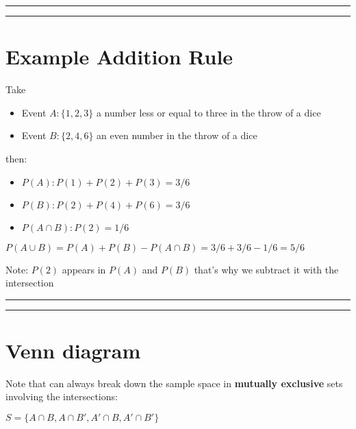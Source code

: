\documentclass[
]{book}
\providecommand{\tightlist}{%
  \setlength{\itemsep}{0pt}\setlength{\parskip}{0pt}}
\begin{document}
\begin{center}\rule{0.5\linewidth}{0.5pt}\end{center}

\begin{center}\rule{0.5\linewidth}{0.5pt}\end{center}

\hypertarget{example-addition-rule}{%
\section{Example Addition Rule}\label{example-addition-rule}}

Take

\begin{itemize}
\tightlist
\item
  Event \(A:\{1,2,3\}\) a number less or equal to three in the throw of a dice\\
\item
  Event \(B:\{2,4,6\}\) an even number in the throw of a dice
\end{itemize}

then:

\begin{itemize}
\tightlist
\item
  \(P(A): P(1) + P(2) + P(3)=3/6\)
\item
  \(P(B): P(2) + P(4) + P(6)=3/6\)
\item
  \(P(A \cap B): P(2) = 1/6\)
\end{itemize}

\(P(A \cup B)=P(A) + P(B) - P(A\cap B)=3/6+3/6-1/6=5/6\)

Note: \(P(2)\) appears in \(P(A)\) and \(P(B)\) that's why we subtract it with the intersection

\begin{center}\rule{0.5\linewidth}{0.5pt}\end{center}

\begin{center}\rule{0.5\linewidth}{0.5pt}\end{center}

\hypertarget{venn-diagram}{%
\section{Venn diagram}\label{venn-diagram}}

Note that can always break down the sample space in \textbf{mutually exclusive} sets involving the intersections:

\(S=\{A\cap B, A \cap B', A'\cap B, A'\cap B'\}\)
\end{document}
